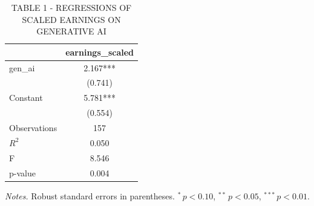 \begin{table}[htbp]\centering
\caption{TABLE 1 - REGRESSIONS OF SCALED EARNINGS ON GENERATIVE AI}
\begin{tabular}{lc}
\toprule
 & earnings\_scaled \\
\midrule
gen\_ai & 2.167*** \\
 & (0.741) \\
\addlinespace
Constant & 5.781*** \\
 & (0.554) \\
\midrule
Observations & 157 \\
$R^2$ & 0.050 \\
F & 8.546 \\
p-value & 0.004 \\
\bottomrule
\end{tabular}
\par\vspace{0.4em}
\parbox{0.6\textwidth}{\footnotesize \emph{Notes.} Robust standard errors in parentheses. $^{*}\,p<0.10$, $^{**}\,p<0.05$, $^{***}\,p<0.01$.}
\end{table}
